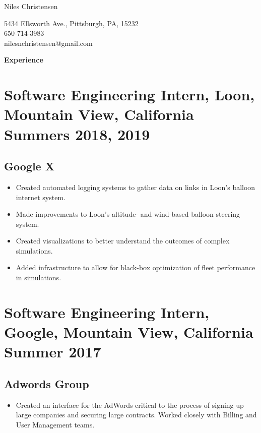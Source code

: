 \documentclass{article}
\newenvironment{tightcenter}{%
  \setlength\topsep{0pt}
  \setlength\parskip{0pt}
  \begin{center}
}{%
  \end{center}
}
\begin{document}
\begin{tightcenter}
\begin{Large}Niles Christensen\\
\end{Large}
\begin{small}
5434 Ellsworth Ave., Pittsburgh, PA, 15232\\
650-714-3983\\
nilesnchristensen@gmail.com
\end{small}
\end{tightcenter}

\noindent
\large{\textbf{Experience}}
\section*{\textbf{Software Engineering Intern, Loon, Mountain View, California \hfill Summers 2018, 2019}}
\subsection*{Google X}
\begin{itemize}[noitemsep]
    \item Created automated logging systems to gather data on links in Loon’s balloon internet system.
    \item Made improvements to Loon's altitude- and wind-based balloon steering system.
    \item Created visualizations to better understand the outcomes of complex simulations.
    \item Added infrastructure to allow for black-box optimization of fleet performance in simulations.
\end{itemize}

\section*{\textbf{Software Engineering Intern, Google, Mountain View, California \hfill Summer 2017}}
\subsection*{Adwords Group}
\begin{itemize}
    \item Created an interface for the AdWords critical to the process of signing up large companies and securing large contracts. Worked closely with Billing and User Management teams.
\end{itemize}
\end{document}
